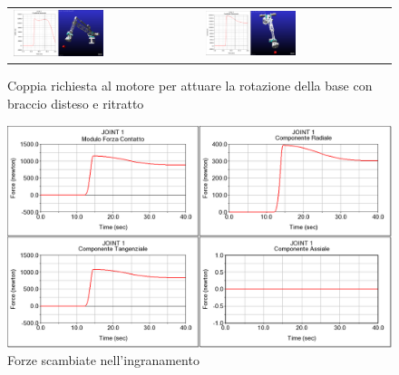 \documentclass[%
corpo=11pt,
twoside,
 stile=classica,
oldstyle,
greek,%
]{toptesi}
\begin{document}
		\begin{figure}
			\centering
			\begin{tabular}{ll}
				\includegraphics[width=0.5\textwidth]{Plots/BASE/joint1_FAVOREVOLE.png}
				&
				\includegraphics[width=0.5\textwidth]{Plots/BASE/joint1_sfavorevole.png}
			\end{tabular}
			\caption{Coppia richiesta al motore per attuare la rotazione della base con braccio disteso e ritratto}
			\label{fig:MBDcoppia1}
		\end{figure}
	
	\begin{figure}
		\centering
		\includegraphics[width=\textwidth]{Plots/BASE/joint1_forze.png}
		\caption{Forze scambiate nell'ingranamento}
		\label{fig:MBDforze1}
	\end{figure}
	
\end{document}
